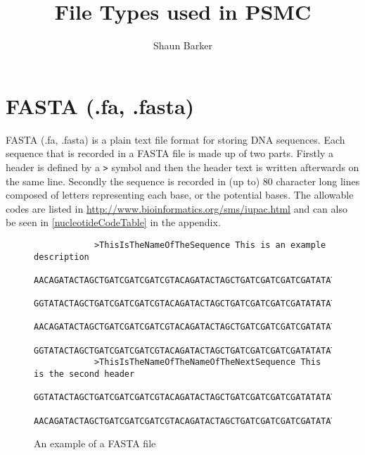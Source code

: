 \documentclass[a4]{article}
\title{File Types used in PSMC}
\author{Shaun Barker}
\begin{document}
\maketitle

\section{FASTA (.fa, .fasta)}
	FASTA (.fa, .fasta) is a plain text file format for storing DNA sequences. Each sequence that is recorded in a FASTA file is made up of two parts. Firstly a header is defined by a \verb|>| symbol and then the header text is written afterwards on the same line. Secondly the sequence is recorded in (up to) 80 character long lines composed of letters representing each base, or the potential bases. The allowable codes are listed in \url{http://www.bioinformatics.org/sms/iupac.html} and can also be seen in \ref{nucleotideCodeTable} in the appendix.
	\begin{figure}[h]
		\begin{lstlisting}
			>ThisIsTheNameOfTheSequence This is an example description
			AACAGATACTAGCTGATCGATCGATCGTACAGATACTAGCTGATCGATCGATCGATATATATATGCCGCGATACGTACGT
			GGTATACTAGCTGATCGATCGATCGTACAGATACTAGCTGATCGATCGATCGATATATATATGCCGCGATACGTACGTAA
			AACAGATACTAGCTGATCGATCGATCGTACAGATACTAGCTGATCGATCGATCGATATATATATGCCGCGATACGTACGT
			GGTATACTAGCTGATCGATCGATCGTACAGATACTAGCTGATCGATCGATCGATATATATATGCCGCGATACGTACGTAA
			>ThisIsTheNameOfTheNameOfTheNextSequence This is the second header
			GGTATACTAGCTGATCGATCGATCGTACAGATACTAGCTGATCGATCGATCGATATATATATGCCGCGATACGTACGTAA
			AACAGATACTAGCTGATCGATCGATCGTACAGATACTAGCTGATCGATCGATCGATATATATATGCCGCGATACGTACGT
		\end{lstlisting}
		\caption{An example of a FASTA file}
	\end{figure}
\end{document}
